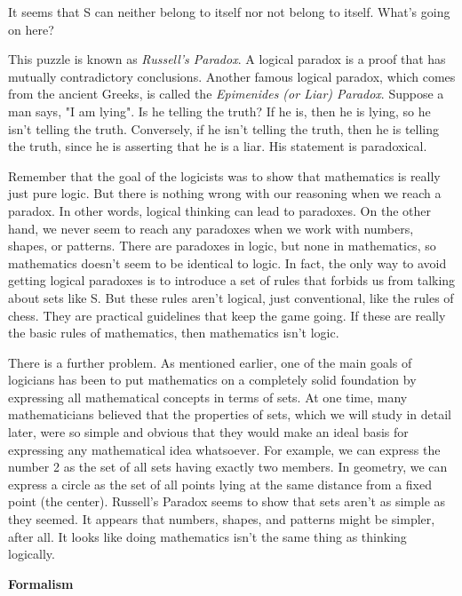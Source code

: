 It seems that S can neither belong to itself nor not belong to itself. What's going on here?

     This puzzle is known as \emph{Russell's Paradox}.  A logical paradox is a proof that has mutually contradictory conclusions.  Another famous logical paradox, which comes from the ancient Greeks, is called the \emph{Epimenides (or Liar) Paradox}.  Suppose a man says, "I am lying".  Is he telling the truth?  If he is, then he is lying, so he isn't telling the truth.  Conversely, if he isn't telling the truth, then he is telling the truth, since he is asserting that he is a liar.  His statement is paradoxical.
     
    Remember that the goal of the logicists was to show that mathematics is really just pure logic.  But there is nothing wrong with our reasoning when we reach a paradox.  In other words, logical thinking can lead to paradoxes.  On the other hand, we never seem to reach any paradoxes when we work with numbers, shapes, or patterns.  There are paradoxes in logic, but none in mathematics, so mathematics doesn't seem to be identical to logic.  In fact, the only way to avoid getting logical paradoxes is to introduce a set of rules that forbids us from talking about sets like S.  But these rules aren't logical, just conventional, like the rules of chess.  They are practical guidelines that keep the game going.  If these are really the basic rules of mathematics, then mathematics isn't logic.
    
     There is a further problem.  As mentioned earlier, one of the main goals of  logicians has been to put mathematics on a completely solid foundation by expressing all mathematical concepts in terms of sets. At one time, many mathematicians believed that the properties of sets, which we will study in detail later,  were so simple and obvious that they would make an ideal basis for expressing any mathematical idea whatsoever.  For example, we can express the number 2 as the set of all sets having exactly two members.  In geometry, we can express a circle as the set of all points lying at the same distance from a fixed point (the center). Russell's Paradox seems to show that sets aren't as simple as they seemed.  It appears that numbers, shapes, and patterns might be simpler, after all.  It looks like doing mathematics isn't the same thing as thinking logically.  
     
\noindent
\textbf{Formalism}

